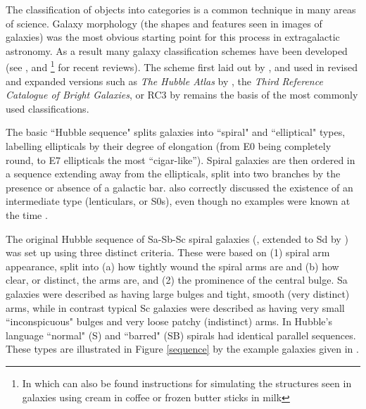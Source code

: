 \documentclass[usenatbib]{mn2e}
\begin{document}
The classification of objects into categories is a common technique in many areas of science. Galaxy morphology (the shapes and features seen in images of galaxies) was the most obvious starting point for this process in extragalactic astronomy. %
As a result many galaxy classification schemes have been developed (see \citealt{Buta2013}, and \citealt{Sandage2005}\footnote{In which can also be found instructions for simulating the structures seen in galaxies using cream in coffee or frozen butter sticks in milk} for recent reviews).
The scheme first laid out by \citet{Hubble1926,Hubble1936}, and used in revised and expanded versions such as {\it The Hubble Atlas} by \citet{Sandage1961}, the {\it Third Reference Catalogue of Bright Galaxies}, or RC3 by \citet{1991rc3..book.....D} remains the basis of the most commonly used classifications. 

The basic ``Hubble sequence" splits galaxies into ``spiral" and ``elliptical" types, labelling ellipticals by their degree of elongation (from E0 being completely round, to E7 ellipticals the most ``cigar-like''). Spiral galaxies are then ordered in a sequence extending away from the ellipticals, split into two branches by the presence or absence of a galactic bar. 
\citet{Hubble1936} also correctly discussed the existence of an intermediate type (lenticulars, or S0s), even though no examples were known at the time \citep{Buta2013}. 

The original Hubble sequence of Sa-Sb-Sc spiral galaxies (\citealt{Hubble1926}, extended to Sd by \citealt{1959HDP....53..275D}) was set up using three distinct criteria. These were based on (1) spiral arm appearance, split into (a) how tightly wound the spiral arms are and (b) how clear, or distinct, the arms are, and (2) the prominence of the central bulge. Sa galaxies were described as having large bulges and tight, smooth (very distinct) arms, while in contrast typical Sc galaxies were described as having very small ``inconspicuous" bulges and very loose patchy (indistinct) arms. In Hubble's language ``normal" (S) and ``barred" (SB) spirals had identical parallel sequences. These types are illustrated in Figure \ref{sequence} by the example galaxies given in \citet{Hubble1926}. 
\end{document}
